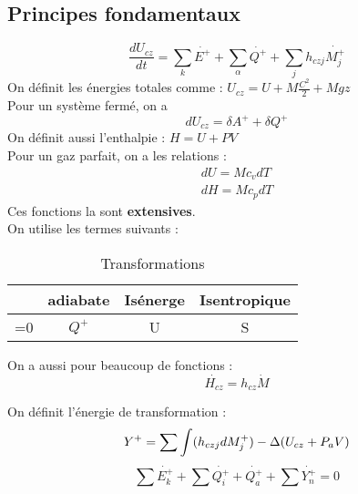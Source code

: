 \documentclass[../main.tex]{subfiles}
\begin{document}
\localtableofcontents
\subsection{Principes fondamentaux}
\begin{equation}
    \frac{dU_{cz}}{dt} = \sum_k \dot{E^+} + \sum_{\alpha} \dot{Q^+} + \sum_j h_{czj}\dot{M_j^+}
\end{equation}
On définit les énergies totales comme : $U_{cz} = U + M \frac{C^2}{2} + Mgz$\\
Pour un système fermé, on a \\
\begin{equation}
    dU_{cz} = \delta A^+ + \delta Q^+
\end{equation}
On définit aussi l'enthalpie : $H = U + PV$\\
Pour un gaz parfait, on a les relations : \\
\begin{equation}
\begin{split}
    dU = M c_v dT\\
    dH = M c_p dT
\end{split}
\end{equation}
Ces fonctions la sont \textbf{extensives}. \\

On utilise les termes suivants : \\
\begin{table}[hbt!]
    \centering
    \begin{tabular}{c|c|c|c}
    \hline
         & adiabate & Isénerge &Isentropique\\
         \hline
        =0 & $Q^+$ & U & S\\
    \end{tabular}
    \caption{Transformations}
\end{table}

On a aussi pour beaucoup de fonctions : \\
\begin{equation}
    \dot{H_{cz}} = h_{cz} \dot{M}
\end{equation}

On définit l'énergie de transformation : \\
\begin{equation}
        Y^+ = \sum \int (h_{czj}dM_j^+) - \Delta (U_{cz} + P_aV)\\
\end{equation}
\begin{equation}
    \sum \dot{E_k^+} + \sum \dot{Q_i^+} + \dot{Q_a^+} + \sum \dot{Y_n^+} = 0
\end{equation}
\end{document}
